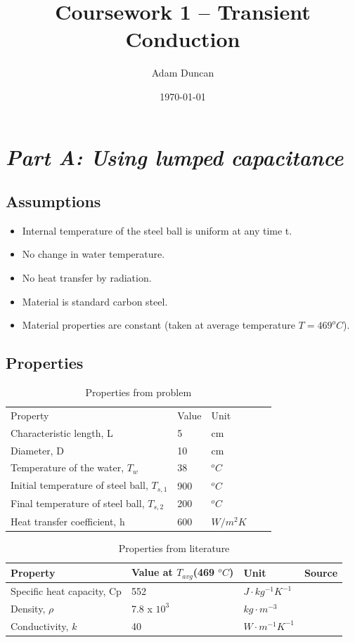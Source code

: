 \documentclass[11pt]{article}
\title{Coursework 1 – Transient Conduction}
\author{Adam Duncan}
\date{\today}
\begin{document}
\maketitle

\section{\emph{Part A: Using lumped capacitance}}
\subsection{Assumptions}
\begin{itemize}
	\item Internal temperature of the steel ball is uniform at any time t.
	\item No change in water temperature.
	\item No heat transfer by radiation.
	\item Material is standard carbon steel.
	\item Material properties are constant (taken at average temperature $T = 469 ^{o}C$).
\end{itemize}
\subsection{Properties}
\begin{table}[h]
	\centering
	\caption{Properties from problem}
	\begin{tabular}{lllll}
		Property & Value & Unit &  &  \\ \cline{1-3}
		Characteristic   length, L & 5 & cm &  &  \\
		Diameter, D & 10 & cm &  &  \\
		Temperature   of the water, $T_w$ & 38 & $^oC$ &  &  \\
		Initial   temperature of steel ball, $T_{s,1}$ & 900 & $^oC$ &  &  \\
		Final   temperature of steel ball, $T_{s,2}$ & 200 & $^oC$ &  &  \\
		Heat transfer   coefficient, h & 600 & $W/m^{2}K$ &  & 
	\end{tabular}
	\label{tab1}
\end{table}

\begin{table}[h]
	\centering
	\caption{Properties from literature}
	\begin{tabular}{llll}
		Property & Value at $T_{avg}$(469 $^{o}C$) & Unit & Source \\ \hline
		Specific heat   capacity, Cp & 552 & $J\cdot kg^{-1} K^{-1}$ & \cite{jean-marc_franssen_fire_2015} \\
		Density, $\rho$ & 7.8 x $10^3$ & $kg\cdot m^{-3}$ & \cite{bergman_fundamentals_2011} \\
		Conductivity, $k$ & 40 & $W\cdot m^{-1} K^{-1} $& \cite{jean-marc_franssen_fire_2015}
	\end{tabular}
	\label{tab2}
\end{table}
\FloatBarrier
\end{document}
